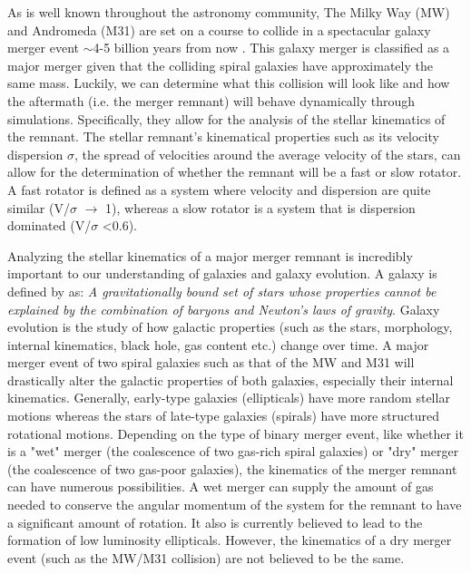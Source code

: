 \documentclass[twocolumn]{aastex63}
\begin{document}
As is well known throughout the astronomy community, The Milky Way (MW) and Andromeda (M31) are set on a course to collide in a spectacular galaxy merger event $\sim$4-5 billion years from now \citep{2012ApJ...753....8V}.  This galaxy merger is classified as a major merger given that the colliding spiral galaxies have approximately the same mass. Luckily, we can determine what this collision will look like and how the aftermath (i.e. the merger remnant) will behave dynamically through simulations.  Specifically, they allow for the analysis of the stellar kinematics of the remnant.  The stellar remnant's kinematical properties such as its velocity dispersion $\sigma$, the spread of velocities around the average velocity of the stars, can allow for the determination of whether the remnant will be a fast or slow rotator.  A fast rotator is defined as a system where velocity and dispersion are quite similar (V/$\sigma$ $\rightarrow$ 1), whereas a slow rotator is a system that is dispersion dominated (V/$\sigma$ \textless 0.6). 


Analyzing the stellar kinematics of a major merger remnant is incredibly important to our understanding of galaxies and galaxy evolution.  A galaxy is defined by \cite{2012AJ....144...76W} as: \textit{A gravitationally bound set of stars whose properties cannot be explained by the combination of baryons and Newton's laws of gravity}.  Galaxy evolution is the study of how galactic properties (such as the stars, morphology, internal kinematics, black hole, gas content etc.) change over time. A major merger event of two spiral galaxies such as that of the MW and M31 will drastically alter the galactic properties of both galaxies, especially their internal kinematics.  Generally, early-type galaxies (ellipticals) have more random stellar motions whereas the stars of late-type galaxies (spirals) have more structured rotational motions.  Depending on the type of binary merger event, like whether it is a "wet" merger (the coalescence of two gas-rich spiral galaxies) or "dry" merger (the coalescence of two gas-poor galaxies), the kinematics of the merger remnant can have numerous possibilities.  A wet merger can supply the amount of gas needed to conserve the angular momentum of the system for the remnant to have a significant amount of rotation.  It also is currently believed to lead to the formation of low luminosity ellipticals.   However, the kinematics of a dry merger event (such as the MW/M31 collision) are not believed to be the same.        
\end{document}
